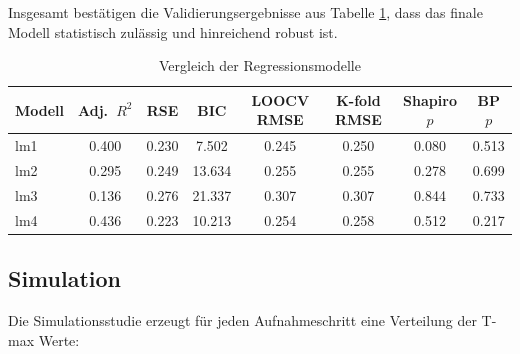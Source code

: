 Insgesamt bestätigen die Validierungsergebnisse aus Tabelle \ref{tab:model_vergleich}, dass das finale Modell statistisch zulässig und hinreichend robust ist.


\begin{table}[htbp]
  \centering
  \caption{Vergleich der Regressionsmodelle}
  \label{tab:model_vergleich}
  \begin{tabular}{lccccccc}
  \toprule
  Modell & Adj.\ $R^2$ & RSE & BIC & LOOCV RMSE & K-fold RMSE & Shapiro $p$ & BP $p$ \\
  \midrule
  lm1 & 0.400 & 0.230 & 7.502 & 0.245 & 0.250 & 0.080 & 0.513 \\
  lm2 & 0.295 & 0.249 & 13.634 & 0.255 & 0.255 & 0.278 & 0.699 \\
  lm3 & 0.136 & 0.276 & 21.337 & 0.307 & 0.307 & 0.844 & 0.733 \\
  lm4 & 0.436 & 0.223 & 10.213 & 0.254 & 0.258 & 0.512 & 0.217 \\
  \bottomrule
  \end{tabular}
  \end{table}

\subsection{Simulation} \label{ErgebnisSim}
Die Simulationsstudie erzeugt für jeden Aufnahmeschritt eine Verteilung der T-max Werte:

\newpage

\newpage

